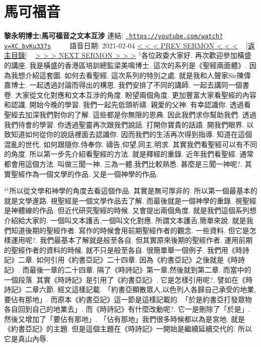 \documentclass{book}
\begin{document}
\section{馬可福音}
\label{sec:XC_bvKu337s}
\textbf{黎永明博士:馬可福音之文本互涉}
\newline
\newline
連結: \href{https://youtube.com/watch?v=XC_bvKu337s}{\texttt{ https://youtube.com/watch?v=XC\_bvKu337s}} ~~~~ 語音日期: 2021-02-04 
\newline
\newline
\hyperref[sec:IJzVofjZ8RU]{\small{< < < PREV SERMON < < <}}
~
\hyperref[sec:index]{\small{[返主目錄]}}
~
\hyperref[sec:6eoLyZcdTqw]{\small{> > > NEXT SERMON > > >}}
\newline
\newline
$^{1}$各位政委大家好.
再次歡迎參加橫盛的講座.
我是橫盛的香港區培訓總監梁美鳴博士.
這次的系列是《聖經兩面體》.
因為我想介紹這套圖.
如何去看聖經.
這次系列的特別之處.
就是我和人聲家Sir陳偉嘉博士.
一起透過討論而得出的構思.
我們安排了不同的講師.
一起去講同一個書卷.
大家從文化對應和文本互涉的角度.
盼望兩個角度.
更加豐富大家看聖經的內容和認識.
開始今晚的學習.
我們一起先低頭祈禱.
親愛的父神.
有幸認識你.
透過看聖經去加深我們對你的了解.
這些都是你無限的恩典.
因此我們求你幫助我們.
透過我們待會的學習.
你透過聖靈再次跟我們說話.
打開你寶貴的話語.
開我們眼界.
以致知道如何從你的說話裡面去認識你.
因而我們的生活再次得到指導.
知道在這個混亂的世代.
如何跟隨你,侍奉你.
禱告,仰望,同主,明求.
其實我們看聖經可以有不同的角度.
所以第一步先介紹看聖經的方法.
就是釋經的重錄.
近年我們看聖經.
通常都會用這個方法.
叫做三聞一神.
三為一體,我們比較熟悉.
甚麼是三聞一神呢?.
其實聖經作為一個文學的作品.
又是一個神學的作品.

$^{41}$所以從文學和神學的角度去看這個作品.
其實是無可厚非的.
所以第一個最基本的就是文學進路.
視聖經是一個文學作品去了解.
而最後就是一個神學的重錄.
視聖經是神體線的作品.
但近代研究聖經的時候.
又會提出兩個角度.
就是我們這個系列想介紹給大家的.
一個叫文本護舌,一個叫文化對應.
所謂文本護舌,簡單來說.
就是我們知道後期的聖經作者.
寫作的時候會用前期聖經作者的觀念.
一些資料.
但它是怎樣運用呢?.
我們最基本了解就是般至各自.
但其實原來後期的聖經作者.
運用前期的聖經作者的資料的時候.
就不只是般至各自.
很簡單舉一個例子.
我們用《時詩記》二章.
如何引用《約書亞記》二十四章.
因為《約書亞記》之後就是《時詩記》.
而最後一章的二十四章.
隔了《時詩記》第一章,然後就到第二章.
而當中的一個段落.
其實《時詩記》是引用了《約書亞記》.
它是怎樣引用呢?.
譬如在《時詩記》二章六節.
經文這樣記載.
「約書亞顯散眾人,以色列人各歸自己承受的地業,要佔有那地」.
而原本《約書亞記》這一節是這樣記載的.
「於是約書亞打發眾物各自回到自己的地業去」.
而《時詩記》有什麼改動呢?.
它一是刪除了「於是」.
然後又增加了「要佔有那地」.
「佔有那地」我們很多時候都以為是宮地.
就是《約書亞記》的主題.
但是這個主題在《時詩記》一開始是繼續延續交代的.
所以它是真山內辱.
\end{document}
